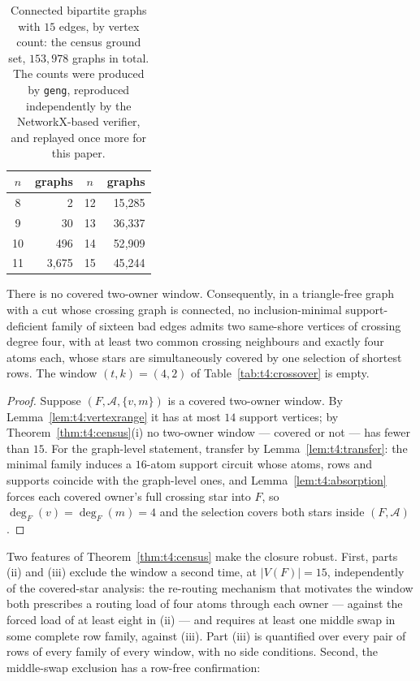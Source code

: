 \begin{table}[ht]
\centering
\begin{tabular}{c@{\quad}r@{\qquad}c@{\quad}r}
\toprule
\(n\) & graphs & \(n\) & graphs\\
\midrule
8  & 2      & 12 & 15{,}285\\
9  & 30     & 13 & 36{,}337\\
10 & 496    & 14 & 52{,}909\\
11 & 3{,}675 & 15 & 45{,}244\\
\bottomrule
\end{tabular}
\caption{Connected bipartite graphs with \(15\) edges, by vertex count:
the census ground set, \(153{,}978\) graphs in total. The counts were
produced by \texttt{geng}, reproduced independently by the
NetworkX-based verifier, and replayed once more for this paper.}
\label{tab:t4:geng}
\end{table}

\begin{corollary}\label{cor:t4:closure}
There is no covered two-owner window. Consequently, in a triangle-free
graph with a cut whose crossing graph is connected, no inclusion-minimal
support-deficient family of sixteen bad edges admits two same-shore
vertices of crossing degree four, with at least two common crossing
neighbours and exactly four atoms each, whose stars are simultaneously covered
by one selection of shortest rows. The window \((t,k)=(4,2)\) of
Table~\textup{\ref{tab:t4:crossover}} is empty.
\end{corollary}

\begin{proof}
Suppose \((F,\mathcal A,\{v,m\})\) is a covered two-owner window. By
Lemma~\ref{lem:t4:vertexrange} it has at most \(14\) support vertices;
by Theorem~\ref{thm:t4:census}(i) no two-owner window --- covered or
not --- has fewer than \(15\). For the graph-level statement, transfer
by Lemma~\ref{lem:t4:transfer}: the minimal family induces a
\(16\)-atom support circuit whose atoms, rows and supports coincide
with the graph-level ones, and Lemma~\ref{lem:t4:absorption} forces
each covered owner's full crossing star into \(F\), so
\(\deg_F(v)=\deg_F(m)=4\) and the selection covers both stars inside
\((F,\mathcal A)\).
\end{proof}

Two features of Theorem~\ref{thm:t4:census} make the closure robust.
First, parts (ii) and (iii) exclude the window a second time, at
\(|V(F)|=15\), independently of the covered-star analysis: the
re-routing mechanism that motivates the window both prescribes a
routing load of four atoms through each owner --- against the forced
load of at least eight in (ii) --- and requires at least one middle
swap in some complete row family, against (iii). Part (iii) is
quantified over every pair of rows of every family of every window,
with no side conditions. Second, the middle-swap exclusion has a
row-free confirmation:

